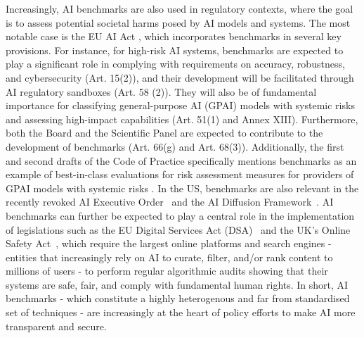 Increasingly, AI benchmarks are also used in regulatory contexts, where the goal is to assess potential societal harms posed by AI models and systems. 
The most notable case is the EU AI Act \cite{AIA24}, which incorporates benchmarks in several key provisions. For instance, for high-risk AI systems, benchmarks are expected to play a significant role in complying with requirements on accuracy, robustness, and cybersecurity (Art. 15(2)), and their development will be facilitated through AI regulatory sandboxes (Art. 58 (2)). They will also be of fundamental importance for classifying general-purpose AI (GPAI) models with systemic risks and assessing high-impact capabilities (Art. 51(1) and Annex XIII). Furthermore, both the Board and the Scientific Panel are expected to contribute to the development of benchmarks (Art. 66(g) and Art. 68(3)). Additionally, the first and second drafts of the Code of Practice specifically mentions benchmarks as an example of best-in-class evaluations for risk assessment measures for providers of GPAI models with systemic risks \cite{1stDraftCoP2024, 2ndDraftCoP2024}. In the US, benchmarks are also relevant in the recently revoked AI Executive Order~\cite{USAIEO2023} and the AI Diffusion Framework~\cite{USAIDiff2025}.
AI benchmarks can further be expected to play a central role in the implementation of legislations such as the EU Digital Services Act (DSA)~\cite{DSA2022} and the UK's Online Safety Act~\cite{UKSafetyAct2023}, which require the largest online platforms and search engines - entities that increasingly rely on AI to curate, filter, and/or rank content to millions of users - to perform regular algorithmic audits showing that their systems are safe, fair, and comply with fundamental human rights. In short, AI benchmarks - which constitute a highly heterogenous and far from standardised set of techniques - are increasingly at the heart of policy efforts to make AI more transparent and secure. 

